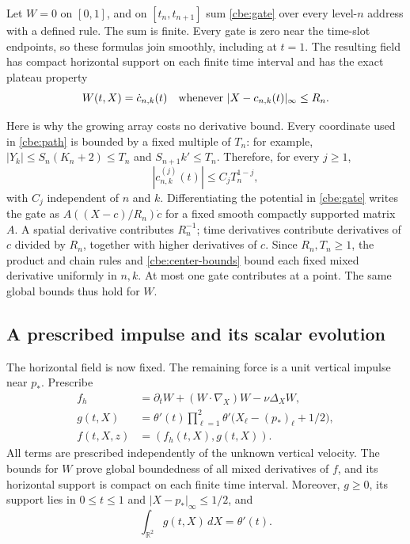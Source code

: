 Let $W=0$ on $[0,1]$, and on $[t_n,t_{n+1}]$ sum
\eqref{cbe:gate} over every level-$n$ address with a defined rule.
The sum is finite.  Every gate is zero near the time-slot endpoints,
so these formulas join smoothly, including at $t=1$.  The resulting
field has compact horizontal support on each finite time interval
and has the exact plateau property
\begin{equation}\label{cbe:plateau}
 W(t,X)=\dot c_{n,k}(t)
 \quad\hbox{whenever }|X-c_{n,k}(t)|_\infty\le R_n.
\end{equation}

Here is why the growing array costs no derivative bound.  Every
coordinate used in \eqref{cbe:path} is bounded by a fixed multiple
of $T_n$: for example,
$|Y_k|\le S_n(K_n+2)\le T_n$ and
$S_{n+1}k'\le T_n$.  Therefore, for every $j\ge1$,
\begin{equation}\label{cbe:center-bounds}
 |c_{n,k}^{(j)}(t)|\le C_j T_n^{1-j},
\end{equation}
with $C_j$ independent of $n$ and $k$.  Differentiating the potential
in \eqref{cbe:gate} writes the gate as
$A((X-c)/R_n)\dot c$ for a fixed smooth compactly supported matrix
$A$.  A spatial derivative contributes $R_n^{-1}$; time derivatives
contribute derivatives of $c$ divided by $R_n$, together with higher
derivatives of $c$.  Since $R_n,T_n\ge1$, the product and chain rules
and \eqref{cbe:center-bounds} bound each fixed mixed derivative
uniformly in $n,k$.  At most one gate contributes at a point.
The same global bounds thus hold for $W$.

\subsection{A prescribed impulse and its scalar evolution}
\label{cbe:scalar-section}

The horizontal field is now fixed.  The remaining force is a unit
vertical impulse near $p_*$.  Prescribe
\begin{equation}\label{cbe:force}
\begin{aligned}
 f_h&=\partial_tW+(W\cdot\nabla_X)W-\nu\Delta_XW,\\
 g(t,X)&=\theta'(t)\prod_{\ell=1}^2\theta'\bigl(X_\ell-(p_*)_\ell+1/2\bigr),\\
 f(t,X,z)&=(f_h(t,X),g(t,X)).
\end{aligned}
\end{equation}
All terms are prescribed independently of the unknown vertical
velocity.  The bounds for $W$ prove global boundedness of all mixed
derivatives of $f$, and its horizontal support is compact on each
finite time interval.  Moreover, $g\ge0$, its support lies in
$0\le t\le1$ and $|X-p_*|_\infty\le1/2$, and
\begin{equation}\label{cbe:impulse}
 \int_{\mathbb R^2}g(t,X)\,dX=\theta'(t).
\end{equation}

